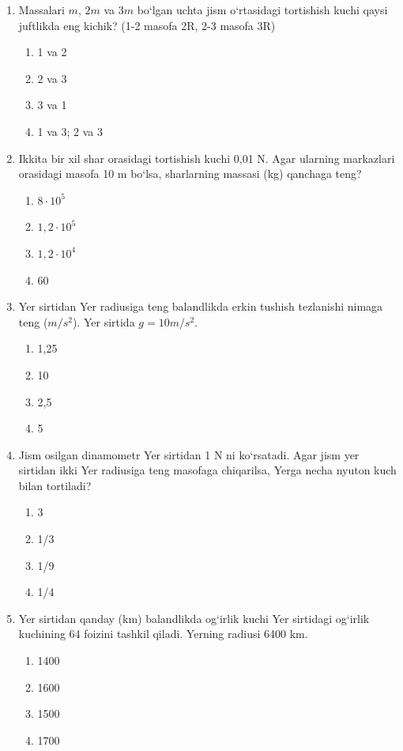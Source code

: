 \begin{enumerate}
\item Massalari $m$, $2m$ va $3m$ bo‘lgan uchta jism o‘rtasidagi tortishish kuchi qaysi juftlikda eng kichik? (1-2 masofa 2R, 2-3 masofa 3R)
\begin{enumerate}[label=\Alph*)]
\item 1 va 2
\item 2 va 3
\item 3 va 1
\item 1 va 3; 2 va 3
\end{enumerate}

\item Ikkita bir xil shar orasidagi tortishish kuchi 0,01 N. Agar ularning markazlari orasidagi masofa 10 m bo‘lsa, sharlarning massasi (kg) qanchaga teng?
\begin{enumerate}[label=\Alph*)]
\item $8 \cdot 10^{5}$
\item $1,2 \cdot 10^{5}$
\item $1,2 \cdot 10^{4}$
\item 60
\end{enumerate}

\item Yer sirtidan Yer radiusiga teng balandlikda erkin tushish tezlanishi nimaga teng ($m/s^2$). Yer sirtida $g = 10 m/s^2$.
\begin{enumerate}[label=\Alph*)]
\item 1,25
\item 10
\item 2,5
\item 5
\end{enumerate}

\item Jism osilgan dinamometr Yer sirtidan 1 N ni ko‘rsatadi. Agar jism yer sirtidan ikki Yer radiusiga teng masofaga chiqarilsa, Yerga necha nyuton kuch bilan tortiladi?
\begin{enumerate}[label=\Alph*)]
\item 3
\item 1/3
\item 1/9
\item 1/4
\end{enumerate}

\item Yer sirtidan qanday (km) balandlikda og‘irlik kuchi Yer sirtidagi og‘irlik kuchining 64 foizini tashkil qiladi. Yerning radiusi 6400 km.
\begin{enumerate}[label=\Alph*)]
\item 1400
\item 1600
\item 1500
\item 1700
\end{enumerate}


\end{enumerate}
